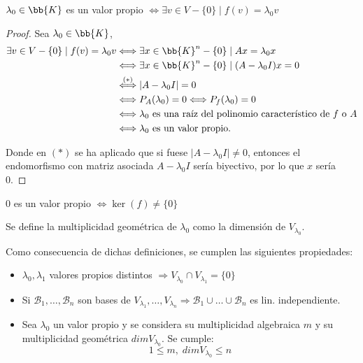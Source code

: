 \begin{prop}
    $\lambda_0\in \bb{K}$ es un valor propio $\Longleftrightarrow \exists v \in V-\{0\} \mid f(v)=\lambda_0 v$
\end{prop}
\begin{proof} Sea $\lambda_0 \in \bb{K}$,
    \begin{equation*}
    \begin{split}
         \exists v \in V-\{0\} \mid f(v)=\lambda_0 v & \Longleftrightarrow \exists x \in \bb{K}^n-\{0\} \mid Ax = \lambda_0 x \\
         & \Longleftrightarrow \exists x \in \bb{K}^n-\{0\} \mid (A-\lambda_0 I)x = 0 \\
         & \stackrel{(\ast)}{\Longleftrightarrow} |A-\lambda_0 I|=0 \\
         & \Longleftrightarrow P_A(\lambda_0)=0 \Longleftrightarrow P_f(\lambda_0)=0 \\
         & \Longleftrightarrow \lambda_0 \text{ es una raíz del polinomio característico de } f \text{ o } A\\
         & \Longleftrightarrow \lambda_0 \text{ es un valor propio}.
    \end{split} 
    \end{equation*}

    Donde en $(\ast)$ se ha aplicado que si fuese $|A-\lambda_0 I|\neq 0$, entonces el endomorfismo con matriz asociada $A-\lambda_0 I$ sería biyectivo, por lo que $x$ sería 0.
    
\end{proof}
\begin{observacion}
    $0$ es un valor propio $\Longleftrightarrow \ker(f)\neq \{0\}$
\end{observacion}


\begin{definicion}
    Se define la multiplicidad geométrica de $\lambda_0$ como la dimensión de $V_{\lambda_0}$.
\end{definicion}

Como consecuencia de dichas definiciones, se cumplen las siguientes propiedades:
\begin{itemize}
    \item $\lambda_0, \lambda_1$ valores propios distintos $\Longrightarrow V_{\lambda_0} \cap V_{\lambda_1} = \{0\}$

    \item Si $\mathcal{B}_1, \dots, \mathcal{B}_n$ son bases de $V_{\lambda_1}, \dots, V_{\lambda_n} \Longrightarrow \mathcal{B}_1 \cup \dots \cup \mathcal{B}_n$ es lin. independiente.

    \item Sea $\lambda_0$ un valor propio y se considera su multiplicidad algebraica $m$ y su multiplicidad geométrica $dim V_{\lambda _0}$. Se cumple:
    $$1 \leq m, \;dim V_{\lambda _0} \leq n$$
\end{itemize}

